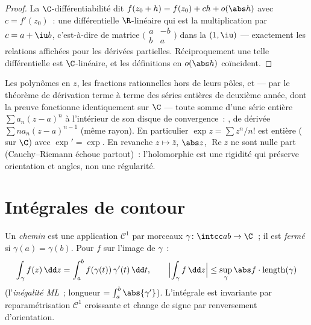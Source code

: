 \begin{proof}
La $\C$-différentiabilité dit $f(z_0 + h) = f(z_0) + ch +
o(\abs h)$ avec $c = f'(z_0)$~: une différentielle $\R$-linéaire
qui est la multiplication par $c = a + \iu b$, c'est-à-dire de
matrice $\bigl(\begin{smallmatrix} a & -b\\ b & a
\end{smallmatrix}\bigr)$ dans la  $(1, \iu)$ --- exactement
les relations affichées pour les dérivées partielles. Réciproquement
une telle différentielle est $\C$-linéaire, et les définitions
en $o(\abs h)$ coïncident.
\end{proof}

\begin{example}\label{ex:b3:holomorphic:examples}
Les polynômes en $z$, les fractions rationnelles hors de leurs
pôles, et --- par le théorème de dérivation terme à terme des
séries entières de deuxième année, dont la preuve fonctionne
identiquement sur $\C$ --- toute somme d'une série entière
$\sum a_n(z - a)^n$ à l'intérieur de son disque de convergence~:
, de dérivée $\sum na_n(z - a)^{n-1}$ (même rayon).
En particulier $\exp z = \sum z^n/n!$ est entière (
sur $\C$) avec $\exp' = \exp$. En revanche $z \mapsto \bar z$,
$\abs z$, $\operatorname{Re}z$ ne sont nulle part 
(Cauchy--Riemann échoue partout)~: l'holomorphie est une rigidité
qui préserve orientation et angles, non une  régularité.
\end{example}

\section{Intégrales de contour}

\begin{definition}\label{def:b3:holomorphic:contour}
Un \emph{chemin} est une application $\mathcal C^1$ par morceaux
$\gamma \colon \intcc ab \to \C$~; il est \emph{fermé} si
$\gamma(a) = \gamma(b)$. Pour $f$  sur l'image de
$\gamma$~:
\[
\int_\gamma f(z)\,\dd z =
\int_a^b f(\gamma(t))\,\gamma'(t)\,\dd t,
\qquad
\Bigl|\int_\gamma f\,\dd z\Bigr| \leq
\sup_{\gamma}\abs f\cdot\operatorname{length}(\gamma)
\]
(l'\emph{inégalité ML}~; longueur $= \int_a^b\abs{\gamma'}$).
L'intégrale est invariante par reparamétrisation $\mathcal C^1$
croissante et change de signe par renversement d'orientation.
\end{definition}

